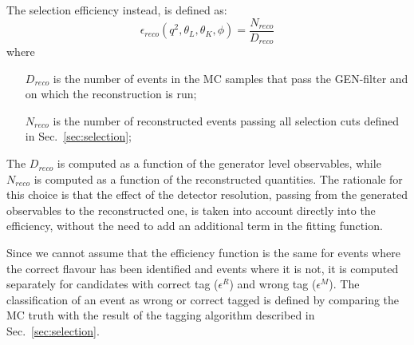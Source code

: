 The selection efficiency instead, is defined as:
\begin{equation}\label{eq:effReco}
    \epsilon_{reco}(q^2,\theta_L,\theta_K,\phi)= \frac{N_{reco}}{D_{reco}}
\end{equation}
where
\begin{itemize}
    \item[$D_{reco}$] is the number of events in the MC samples that pass the GEN-filter and on which the reconstruction is run;
    \item[$N_{reco}$] is the number of reconstructed events passing all selection cuts defined in Sec.~\ref{sec:selection};
\end{itemize}

The $D_{reco}$ is computed as a function of the generator level observables, while $N_{reco}$ is computed as a function of the reconstructed quantities.
The rationale for this choice is that the effect of the detector resolution, passing from the generated observables to the reconstructed one, is taken into account directly into the efficiency, without the need to add an additional term in the fitting function.

Since we cannot assume that the efficiency function is the same for events where the correct flavour has been identified and events where it is not, it is computed separately for candidates with correct tag ($\epsilon^R$) and wrong tag ($\epsilon^M$).
The classification of an event as wrong or correct tagged is defined by comparing the MC truth with the result of the tagging algorithm described in Sec.~\ref{sec:selection}.



